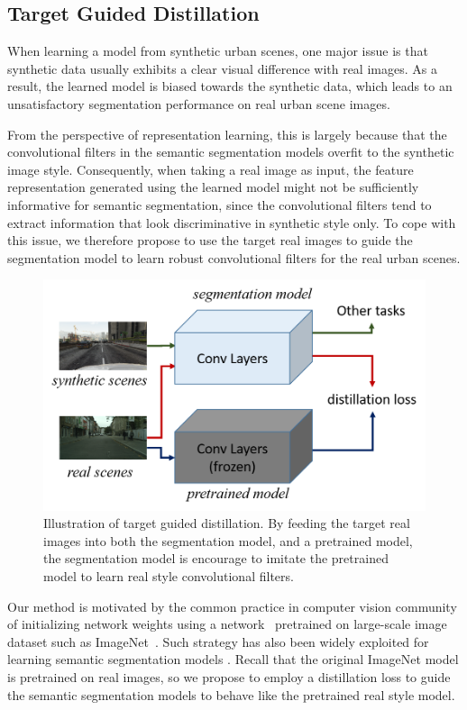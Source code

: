 \documentclass[10pt,twocolumn,letterpaper]{article}
\begin{document}
\subsection{Target Guided Distillation}
\label{sec:rso}
When learning a model from synthetic urban scenes, one major issue is that synthetic data usually exhibits a clear visual difference with real images. As a result, the learned model is biased towards the synthetic data, which leads to an unsatisfactory segmentation performance on real urban scene images. 

From the perspective of representation learning, this is largely because that the convolutional filters in the semantic segmentation models overfit to the synthetic image style. Consequently, when taking a real image as input, the feature representation generated using the learned model might not be sufficiently informative for semantic segmentation, since the convolutional filters tend to extract information that look discriminative in synthetic style only. To cope with this issue, we therefore propose to use the target real images to guide the segmentation model to learn robust convolutional filters for the real urban scenes. 

\begin{figure}
\centering
\includegraphics[width=0.9\linewidth]{fig_rso.png}
\caption{Illustration of target guided distillation. By feeding the target real images into both the segmentation model, and a pretrained model, the segmentation model is encourage to imitate the pretrained model to learn real style convolutional filters.}
\label{fig:fig_rso}
\end{figure}

Our method is motivated by the common practice in computer vision community of initializing network weights using a network~\cite{he2016deep,simonyan2014very} pretrained on large-scale image dataset such as ImageNet~\cite{imagenet_cvpr09}. Such strategy has also been widely exploited for learning semantic segmentation models \cite{chen2016deeplab,yu2015multi,zhao2016pyramid}. Recall that the original ImageNet model is pretrained on real images, so we propose to employ a distillation loss to guide the semantic segmentation models to behave like the pretrained real style model. 
\end{document}
